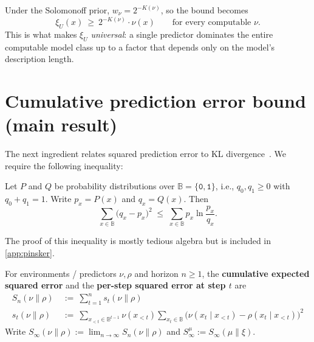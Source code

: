 \documentclass[fontsize=11pt, parskip=half]{scrartcl}
\newcommand{\Sn}[2]{S_{n}(#1 \parallel #2)}
\begin{document}
\begin{remark}
Under the Solomonoff prior, $w_\nu = 2^{-K(\nu)}$, so the bound becomes
\[
  \xi_U(x) ~\geq~ 2^{-K(\nu)} \cdot \nu(x) \qquad \text{for every computable }\nu.
\]
This is what makes $\xi_U$ \emph{universal}: a single predictor dominates the
entire computable model class up to a factor that depends only on the model's
description length.
\end{remark}

\section{Cumulative prediction error bound (main result)}\label{prob:bound}


The next ingredient relates squared prediction error to KL divergence~\cite[Lemma~11.6.1]{Cover:06}. 
We require the following inequality:

\begin{theorem}\label{thm:pinsker}
Let $P$ and $Q$ be probability distributions over $\mathbb{B} = \{\texttt{0}, \texttt{1}\}$, i.e., $q_0, q_1 \geq 0$
with $q_0 + q_1 = 1$. Write $p_x = P(x)$ and $q_x = Q(x)$. Then
\[
    \sum_{x \in \mathbb{B}} \big( q_x - p_x \big)^2 \;\leq\; \sum_{x \in \mathbb{B}} p_x \ln \frac{p_x}{q_x}.
    \tag{$\star$}
\]

\end{theorem}
The proof of this inequality is mostly tedious algebra but is included in \cref{app:pinsker}. 


\begin{definition}\label{def:S_infty}
For environments / predictors $\nu, \rho$ and horizon $n \geq 1$, the \textbf{cumulative expected squared error} and the \textbf{per-step squared error at step $t$} are
\begin{align*}
\Sn{\nu}{\rho} ~&:=~ \sum_{t=1}^n s_t(\nu \parallel \rho) \\
s_t(\nu \parallel \rho) ~&:=~ \sum_{x_{<t} \in \mathbb{B}^{t-1}} \nu(x_{<t}) \sum_{x_t \in \mathbb{B}} \bigl(\nu(x_t \mid x_{<t}) - \rho(x_t \mid x_{<t})\bigr)^2
\end{align*}
Write $S_{\infty}(\nu \parallel \rho) := \lim_{n \to \infty} \Sn{\nu}{\rho}$
and $S_\infty^\mu := S_{\infty}(\mu \parallel \xi)$.
\end{definition}
\end{document}
